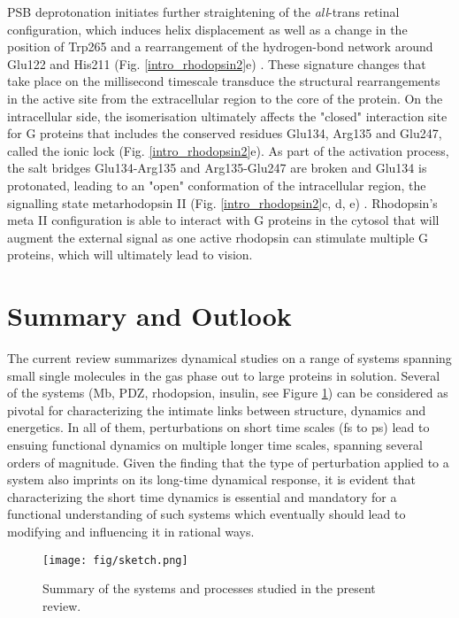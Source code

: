 \documentclass[journal=jacsat,manuscript=article]{achemso}
\begin{document}
PSB deprotonation initiates further straightening of the
\emph{all}-trans retinal configuration, which induces helix
displacement as well as a change in the position of Trp265
\cite{crocker2006location} and a rearrangement of the hydrogen-bond
network around Glu122 and His211 (Fig. \ref{intro_rhodopsin2}e)
\cite{vogel2005agonists,lewis2006proton}. These signature changes that
take place on the millisecond timescale transduce the structural
rearrangements in the active site from the extracellular region to the
core of the protein. On the intracellular side, the isomerisation
ultimately affects the "closed" interaction site for G proteins that
includes the conserved residues Glu134, Arg135 and Glu247, called the
ionic lock (Fig. \ref{intro_rhodopsin2}e). As part of the activation
process, the salt bridges Glu134-Arg135 and Arg135-Glu247 are broken
and Glu134 is protonated, leading to an "open" conformation of the
intracellular region, the signalling state metarhodopsin II
(Fig. \ref{intro_rhodopsin2}c, d, e)
\cite{mahalingam2008two,choe2011crystal,deupi2012stabilized}. Rhodopsin's
meta II configuration is able to interact with G proteins in the
cytosol that will augment the external signal as one active rhodopsin
can stimulate multiple G proteins, which will ultimately lead to
vision.

  

\section{Summary and Outlook}
The current review summarizes dynamical studies on a range of systems
spanning small single molecules in the gas phase out to large proteins
in solution. Several of the systems (Mb, PDZ, rhodopsion, insulin, see
Figure \ref{fig:sketch}) can be considered as pivotal for
characterizing the intimate links between structure, dynamics and
energetics. In all of them, perturbations on short time scales (fs to
ps) lead to ensuing functional dynamics on multiple longer time
scales, spanning several orders of magnitude. Given the finding that
the type of perturbation applied to a system also imprints on its
long-time dynamical response, it is evident that characterizing the
short time dynamics is essential and mandatory for a functional
understanding of such systems which eventually should lead to
modifying and influencing it in rational ways.

\begin{figure}
\texttt{[image: fig/sketch.png]}
\caption{Summary of the systems and processes studied in the present
  review.}
\label{fig:sketch}
\end{figure} 
    
\end{document}
